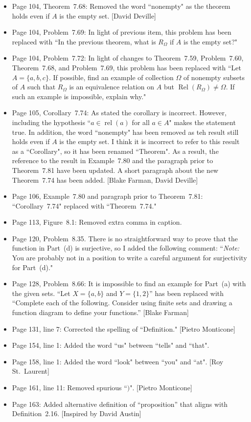 \documentclass[11pt]{article}%
\DeclareMathOperator{\rel}{rel}
\newcommand{\Rel}{\operatorname{Rel}}
\begin{document}
\begin{itemize}
\item Page 104, Theorem~7.68: Removed the word ``nonempty" as the theorem holds even if $A$ is the empty set. [David Deville]
\item Page 104, Problem~7.69: In light of previous item, this problem has been replaced  with ``In the previous theorem, what is $R_{\Omega}$ if $A$ is the empty set?"
\item Page 104, Problem~7.72: In light of changes to Theorem~7.59, Problem~7.60, Theorem~7.68, and Problem~7.69, this problem has been replaced  with ``Let $A=\{a,b,c\}$. If possible, find an example of collection $\Omega$ of nonempty subsets of $A$ such that $R_{\Omega}$ is an equivalence relation on $A$ but $\Rel(R_{\Omega})\neq \Omega$.  If such an example is impossible, explain why."
\item Page 105, Corollary~7.74: As stated the corollary is incorrect. However, including the hypothesis ``$a\in\rel(a)$ for all $a\in A$" makes the statement true. In addition, the word ``nonempty" has been removed as teh result still holds even if $A$ is the empty set. I think it is incorrect to refer to this result as a ``Corollary", so it has been renamed ``Theorem". As a result, the reference to the result in Example~7.80 and the paragraph prior to Theorem~7.81 have been updated. A short paragraph about the new Theorem~7.74 has been added. [Blake Farman, David Deville]
\item Page 106, Example~7.80 and paragraph prior to Theorem~7.81: ``Corollary~7.74" replaced with ``Theorem~7.74."
\item Page 113, Figure~8.1: Removed extra comma in caption.
\item Page 120, Problem~8.35. There is no straightforward way to prove that the function in Part~(d) is surjective, so I added the following comment: ``\emph{Note:} You are probably not in a position to write a careful argument for surjectivity for Part~(d)."  
\item Page 128, Problem~8.66: It is impossible to find an example for Part~(a) with the given sets.  ``Let $X=\{a,b\}$ and $Y=\{1,2\}$'' has been replaced with ``Complete each of the following. Consider using finite sets and drawing a function diagram to define your functions.'' [Blake Farman]
\item Page 131, line 7: Corrected the spelling of ``Definition." [Pietro Monticone]
\item Page 154, line 1: Added the word ``us" between ``tells" and ``that".
\item Page 158, line 1: Added the word ``look" between ``you" and ``at". [Roy St.~Laurent]
\item Page 161, line 11: Removed spurious ``$)$". [Pietro Monticone]
\item Page 163: Added alternative definition of ``proposition'' that aligns with Definition~2.16. [Inspired by David Austin]
\end{itemize}
\end{document}
